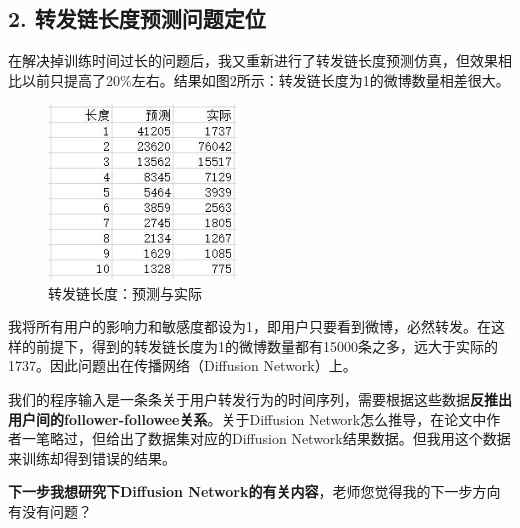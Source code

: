 \documentclass[UTF8]{ctexart}
\begin{document}
\subsection*{2. 转发链长度预测问题定位}
\par 
在解决掉训练时间过长的问题后，我又重新进行了转发链长度预测仿真，但效果相比以前只提高了20$\%$左右。结果如图$2$所示：转发链长度为1的微博数量相差很大。
\begin{figure}[h!]
    \centering
    \includegraphics[width=5cm]{size.jpg}
    \caption{转发链长度：预测与实际}
    \label{fig-sample}
\end{figure}
\par
我将所有用户的影响力和敏感度都设为1，即用户只要看到微博，必然转发。在这样的前提下，得到的转发链长度为1的微博数量都有15000条之多，远大于实际的1737。因此问题出在传播网络（Diffusion Network）上。
\par
我们的程序输入是一条条关于用户转发行为的时间序列，需要根据这些数据\textbf{反推出用户间的follower-followee关系}。关于Diffusion Network怎么推导，在论文中作者一笔略过，但给出了数据集对应的Diffusion Network结果数据。但我用这个数据来训练却得到错误的结果。
\par
\textbf{下一步我想研究下Diffusion Network的有关内容}，老师您觉得我的下一步方向有没有问题？
\par {}
\end{document}
